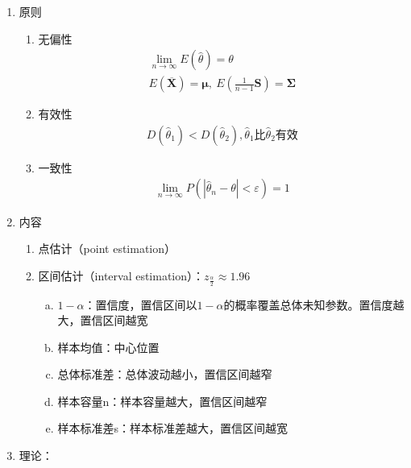 \documentclass[12pt]{book}
\begin{document}
\begin{enumerate}[1.]
    \item 原则
          \begin{enumerate}[(1)]
              \item 无偏性
                    \begin{gather*}
                        \lim_{n→\infty}{E(\hat{\theta})=\theta } \\
                        E\left(\overline{\bm{X}}\right)=\bm{\mu},\ E\left(\frac{1}{n-1}\bm{S}\right)=\bm{\Sigma}
                    \end{gather*}
              \item 有效性
                    \begin{gather*}
                        D(\hat{\theta}_1)<D(\hat{\theta}_2),\hat{\theta}_1\text{比}\hat{\theta}_2\text{有效}
                    \end{gather*}
              \item 一致性
                    \begin{gather*}
                        \lim_{n\rightarrow\infty}{P\left({\left|{\hat{\theta}}_n-\theta\right|<\varepsilon}\right)}=1
                    \end{gather*}
          \end{enumerate}
    \item 内容
          \begin{enumerate}[(1)]
              \item 点估计（point estimation）
              \item 区间估计（interval estimation）：$z_{\frac{\alpha}{2}}\approx 1.96$
                    \begin{enumerate}[a.]
                        \item $1-\alpha$：置信度，置信区间以$1-\alpha$的概率覆盖总体未知参数。置信度越大，置信区间越宽
                        \item 样本均值：中心位置
                        \item 总体标准差：总体波动越小，置信区间越窄
                        \item 样本容量n：样本容量越大，置信区间越窄
                        \item 样本标准差s：样本标准差越大，置信区间越宽
                    \end{enumerate}
          \end{enumerate}
    \item 理论：
          \begin{enumerate}[(1)]

\end{enumerate}
\end{enumerate}
\end{document}
